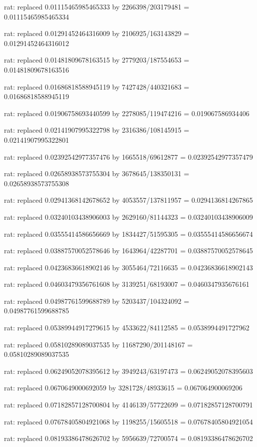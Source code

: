 \documentclass[a4paper,10pt]{article}
\begin{document}
\begin{eulernotebook}
\begin{eulercomment}
\begin{eulercomment}
\begin{eulercomment}
\begin{eulercomment}
\begin{eulercomment}
\begin{eulercomment}
\begin{eulercomment}
\begin{eulercomment}
\begin{eulercomment}
\begin{eulercomment}
\begin{eulercomment}
\begin{eulercomment}
\begin{eulercomment}
\begin{eulercomment}
\begin{eulercomment}
\begin{eulercomment}
\begin{euleroutput}
  rat: replaced 0.01115465985465333 by 2266398/203179481 = 0.01115465985465334
  
  rat: replaced 0.01291452464316009 by 2106925/163143829 = 0.01291452464316012
  
  rat: replaced 0.01481809678163515 by 2779203/187554653 = 0.01481809678163516
  
  rat: replaced 0.01686818588945119 by 7427428/440321683 = 0.01686818588945119
  
  rat: replaced 0.01906758693440599 by 2278085/119474216 = 0.019067586934406
  
  rat: replaced 0.02141907995322798 by 2316386/108145915 = 0.02141907995322801
  
  rat: replaced 0.02392542977357476 by 1665518/69612877 = 0.02392542977357479
  
  rat: replaced 0.02658938573755304 by 3678645/138350131 = 0.02658938573755308
  
  rat: replaced 0.02941368142678652 by 4053557/137811957 = 0.0294136814267865
  
  rat: replaced 0.03240103438906003 by 2629160/81144323 = 0.03240103438906009
  
  rat: replaced 0.03555414586656669 by 1834427/51595305 = 0.03555414586656674
  
  rat: replaced 0.03887570052578646 by 1643964/42287701 = 0.03887570052578645
  
  rat: replaced 0.04236836618902146 by 3055464/72116635 = 0.04236836618902143
  
  rat: replaced 0.04603479356761608 by 3139251/68193007 = 0.0460347935676161
  
  rat: replaced 0.04987761599688789 by 5203437/104324092 = 0.04987761599688785
  
  rat: replaced 0.05389944917279615 by 4533622/84112585 = 0.0538994491727962
  
  rat: replaced 0.05810289089037535 by 11687290/201148167 = 0.05810289089037535
  
  rat: replaced 0.06249052078395612 by 3949243/63197473 = 0.06249052078395603
  
  rat: replaced 0.0670649000692059 by 3281728/48933615 = 0.067064900069206
  
  rat: replaced 0.07182857128700804 by 4146139/57722699 = 0.07182857128700791
  
  rat: replaced 0.07678405804921068 by 1198255/15605518 = 0.07678405804921054
  
  rat: replaced 0.08193386478626702 by 5956639/72700574 = 0.08193386478626702
  

\end{euleroutput}
\end{eulercomment}
\end{eulercomment}
\end{eulercomment}
\end{eulercomment}
\end{eulercomment}
\end{eulercomment}
\end{eulercomment}
\end{eulercomment}
\end{eulercomment}
\end{eulercomment}
\end{eulercomment}
\end{eulercomment}
\end{eulercomment}
\end{eulercomment}
\end{eulercomment}
\end{eulercomment}
\end{eulernotebook}
\end{document}
